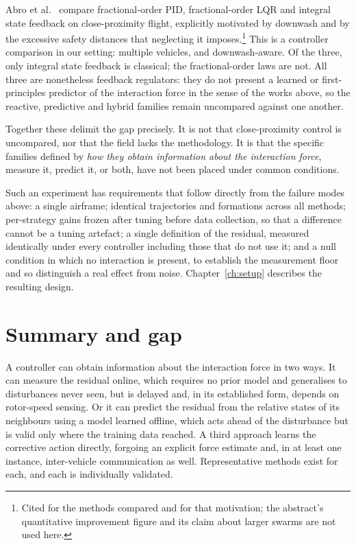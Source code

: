 Abro et al.~\cite{abro2025fractional} compare fractional-order PID, fractional-order LQR and
integral state feedback on close-proximity flight, explicitly motivated by downwash and by the
excessive safety distances that neglecting it imposes.\footnote{Cited for the methods compared and
for that motivation; the abstract's quantitative improvement figure and its claim about larger
swarms are not used here.} This is a controller comparison in our setting: multiple vehicles, and
downwash-aware. Of the three, only integral state feedback is classical; the fractional-order laws
are not. All three are nonetheless feedback regulators: they do not present a learned or
first-principles predictor of the interaction force in the sense of the works above, so the
reactive, predictive and hybrid families remain uncompared against one another.

Together these delimit the gap precisely. It is not that close-proximity control is uncompared, nor
that the field lacks the methodology. It is that the specific families defined by \emph{how they
obtain information about the interaction force}, measure it, predict it, or both, have not
been placed under common conditions.

Such an experiment has requirements that follow directly from the failure modes above: a single
airframe; identical trajectories and formations across all methods; per-strategy gains frozen after
tuning before data collection, so that a difference cannot be a tuning artefact; a single definition
of the residual, measured identically under every controller
including those that do not use it; and a null condition in which no interaction is present, to
establish the measurement floor and so distinguish a real effect from noise. Chapter~\ref{ch:setup}
describes the resulting design.

\section{Summary and gap}
\label{sec:rw-gap}

A controller can obtain information about the interaction force in two ways. It can measure the
residual online, which requires no prior model and generalises to disturbances never seen, but is
delayed and, in its established form, depends on rotor-speed sensing. Or it can predict the
residual from the relative states of its neighbours using a model learned offline, which acts ahead
of the disturbance but is valid only where the training data reached. A third approach learns the
corrective action directly, forgoing an explicit force estimate and, in at least one instance,
inter-vehicle communication as well. Representative methods exist for each, and each is
individually validated.

